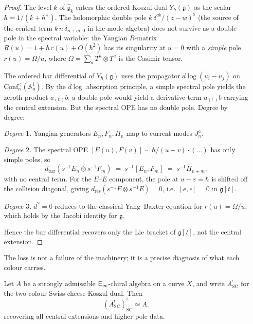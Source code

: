 \begin{proof}
The level $k$ of $\widehat{\mathfrak{g}}_k$ enters the ordered Koszul dual
$Y_\hbar(\mathfrak{g})$ as the scalar $\hbar = 1/(k + h^\vee)$.
The holomorphic double pole $k\,\delta^{ab}/(z-w)^2$ (the source
of the central term $k\,n\,\delta_{n+m,0}$ in the mode algebra)
does not survive as a double pole in the spectral variable: the
Yangian $R$-matrix $R(u) = 1 + \hbar\,r(u) + O(\hbar^2)$ has its
singularity at $u = 0$ with a \emph{simple} pole $r(u) = \Omega/u$,
where $\Omega = \sum_a T^a \otimes T^a$ is the Casimir tensor.

The ordered bar differential of $Y_\hbar(\mathfrak{g})$ uses the
propagator $d\log(u_i - u_j)$ on
$\mathrm{Conf}_n^{<}(\mathbb{A}^1_u)$. By the $d\log$ absorption
principle, a simple spectral pole yields the zeroth product
$a_{(0)}b$; a double pole would yield a derivative term
$a_{(1)}b$ carrying the central extension. But the spectral OPE has
no double pole. Degree by degree:

\smallskip\noindent\emph{Degree $1$.}
Yangian generators $E_n, F_n, H_n$ map to current modes $J^a_n$.

\smallskip\noindent\emph{Degree $2$.}
The spectral OPE
$[E(u), F(v)] \sim \hbar/(u-v)\cdot(\ldots)$ has only simple poles, so
\[
d_{\mathrm{bar}}(s^{-1}E_n \otimes s^{-1}F_m)
\;=\;
s^{-1}[E_n, F_m]
\;=\;
s^{-1}H_{n+m},
\]
with no central term. For the $E$--$E$ component, the pole at
$u - v = \hbar$ is shifted off the collision diagonal, giving
$d_{\mathrm{res}}(s^{-1}E \otimes s^{-1}E) = 0$, i.e.\
$[e,e] = 0$ in $\mathfrak{g}[t]$.

\smallskip\noindent\emph{Degree $3$.}
$d^2 = 0$ reduces to the classical Yang--Baxter equation for
$r(u) = \Omega/u$, which holds by the Jacobi identity for
$\mathfrak{g}$.

\smallskip
Hence the bar differential recovers only the Lie bracket of
$\mathfrak{g}[t]$, not the central extension.
\end{proof}

The loss is not a failure of the machinery; it is a precise
diagnosis of what each colour carries.

\begin{theorem}
\ClaimStatusProvedHere
\label{thm:two-colour-double-kd}
Let $A$ be a strongly admissible $\mathsf{E}_{\infty}$-chiral algebra on a curve
$X$, and write $A^!_{\mathrm{SC}}$ for the two-colour
Swiss-cheese Koszul dual. Then
\[
(A^!_{\mathrm{SC}})^!_{\mathrm{SC}}\simeq A,
\]
recovering all central extensions and higher-pole data.
\end{theorem}

